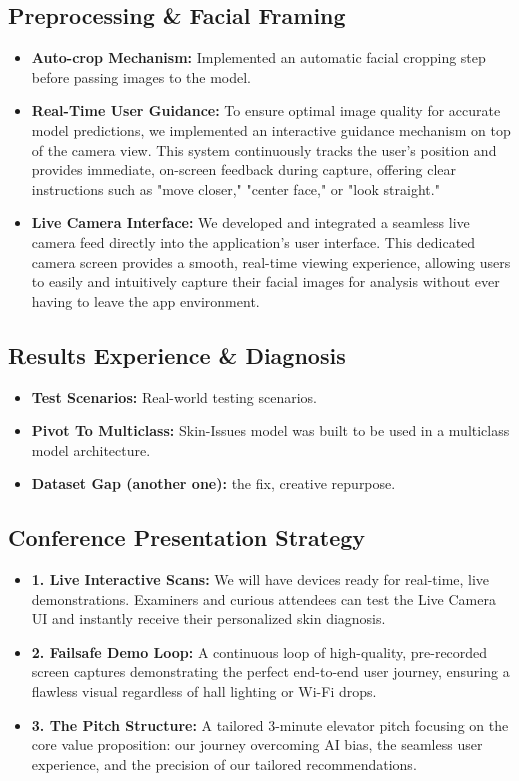 \documentclass[12pt,a4paper]{article}
\begin{document}
\subsection{Preprocessing \& Facial Framing}
\begin{itemize}
    \item \textbf{Auto-crop Mechanism:} Implemented an automatic facial cropping step before passing images to the model.
    \item \textbf{Real-Time User Guidance:} To ensure optimal image quality for accurate model predictions, we implemented an interactive guidance mechanism on top of the camera view. This system continuously tracks the user's position and provides immediate, on-screen feedback during capture, offering clear instructions such as "move closer," "center face," or "look straight."
    \item \textbf{Live Camera Interface:} We developed and integrated a seamless live camera feed directly into the application's user interface. This dedicated camera screen provides a smooth, real-time viewing experience, allowing users to easily and intuitively capture their facial images for analysis without ever having to leave the app environment.
\end{itemize}

\subsection{Results Experience \& Diagnosis}
\begin{itemize}
    \item \textbf{Test Scenarios:} Real-world testing scenarios.
    \item \textbf{Pivot To Multiclass:} Skin-Issues model was built to be used in a multiclass model architecture.
    \item \textbf{Dataset Gap (another one):} the fix, creative repurpose.
\end{itemize}

\subsection{Conference Presentation Strategy}
\begin{itemize}
    \item \textbf{1. Live Interactive Scans:} We will have devices ready for real-time, live demonstrations. Examiners and curious attendees can test the Live Camera UI and instantly receive their personalized skin diagnosis.
    \item \textbf{2. Failsafe Demo Loop:} A continuous loop of high-quality, pre-recorded screen captures demonstrating the perfect end-to-end user journey, ensuring a flawless visual regardless of hall lighting or Wi-Fi drops.
    \item \textbf{3. The Pitch Structure:} A tailored 3-minute elevator pitch focusing on the core value proposition: our journey overcoming AI bias, the seamless user experience, and the precision of our tailored recommendations.
\end{itemize}
\end{document}
